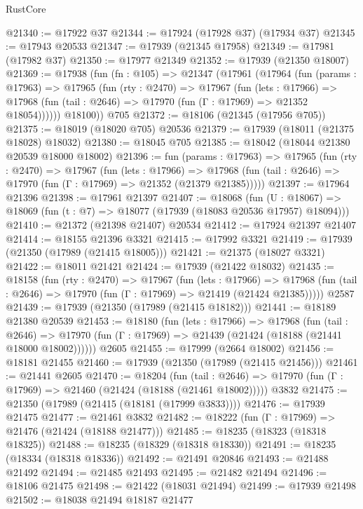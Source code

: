 \begin{lexlean}{RustCore}
\begin{coremodule}
@21340 := @17922 @37
@21344 := @17924 (@17928 @37) (@17934 @37)
@21345 := @17943 @20533
@21347 := @17939 (@21345 @17958)
@21349 := @17981 (@17982 @37)
@21350 := @17977 @21349
@21352 := @17939 (@21350 @18007)
@21369 := @17938
    (fun (fn : @105) =>
    @21347
      (@17961
        (@17964
          (fun (params : @17963) =>
          @17965
            (fun (rty : @2470) =>
            @17967
              (fun (lets : @17966) =>
              @17968 (fun (tail : @2646) => @17970 (fun (Γ : @17969) => @21352 @18054))))))
        @18100))
    @705
@21372 := @18106 (@21345 (@17956 @705))
@21375 := @18019 (@18020 @705) @20536
@21379 := @17939 (@18011 (@21375 @18028) @18032)
@21380 := @18045 @705
@21385 := @18042 (@18044 @21380 @20539 @18000 @18002)
@21396 := fun (params : @17963) =>
  @17965
    (fun (rty : @2470) =>
    @17967
      (fun (lets : @17966) =>
      @17968 (fun (tail : @2646) => @17970 (fun (Γ : @17969) => @21352 (@21379 @21385)))))
@21397 := @17964 @21396
@21398 := @17961 @21397
@21407 := @18068
    (fun (U : @18067) => @18069 (fun (t : @7) => @18077 (@17939 (@18083 @20536 @17957) @18094)))
@21410 := @21372 (@21398 @21407) @20534
@21412 := @17924 @21397 @21407
@21414 := @18155 @21396 @3321
@21415 := @17992 @3321
@21419 := @17939 (@21350 (@17989 (@21415 @18005)))
@21421 := @21375 (@18027 @3321)
@21422 := @18011 @21421
@21424 := @17939 (@21422 @18032)
@21435 := @18158
    (fun (rty : @2470) =>
    @17967
      (fun (lets : @17966) =>
      @17968 (fun (tail : @2646) => @17970 (fun (Γ : @17969) => @21419 (@21424 @21385)))))
    @2587
@21439 := @17939 (@21350 (@17989 (@21415 @18182)))
@21441 := @18189 @21380 @20539
@21453 := @18180
    (fun (lets : @17966) =>
    @17968
      (fun (tail : @2646) =>
      @17970 (fun (Γ : @17969) => @21439 (@21424 (@18188 (@21441 @18000 @18002))))))
    @2605
@21455 := @17999 (@2664 @18002)
@21456 := @18181 @21455
@21460 := @17939 (@21350 (@17989 (@21415 @21456)))
@21461 := @21441 @2605
@21470 := @18204
    (fun (tail : @2646) => @17970 (fun (Γ : @17969) => @21460 (@21424 (@18188 (@21461 @18002)))))
    @3832
@21475 := @21350 (@17989 (@21415 (@18181 (@17999 @3833))))
@21476 := @17939 @21475
@21477 := @21461 @3832
@21482 := @18222 (fun (Γ : @17969) => @21476 (@21424 (@18188 @21477)))
@21485 := @18235 (@18323 (@18318 @18325))
@21488 := @18235 (@18329 (@18318 @18330))
@21491 := @18235 (@18334 (@18318 @18336))
@21492 := @21491 @20846
@21493 := @21488 @21492
@21494 := @21485 @21493
@21495 := @21482 @21494
@21496 := @18106 @21475
@21498 := @21422 (@18031 @21494)
@21499 := @17939 @21498
@21502 := @18038 @21494 @18187 @21477

\end{coremodule}
\end{lexlean}
